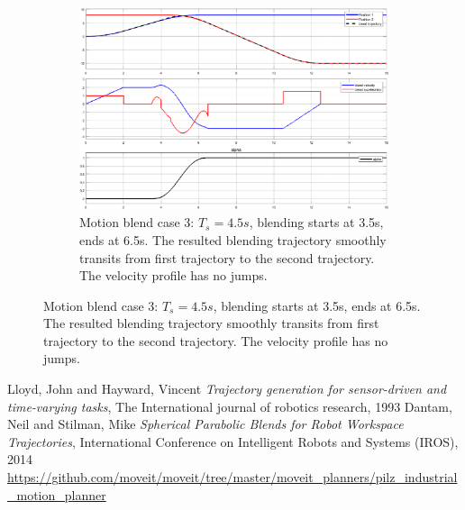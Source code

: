 \documentclass{article}
\begin{document}
\begin{figure}[ht]
	\begin{subfigure}[ht]{0.8\textwidth}%
		\centering
		\includegraphics[width=0.8\columnwidth]{figure/blend_case_3.eps}%
		\caption{Motion blend case 3: $T_s = 4.5s$, blending starts at 3.5s, ends at 6.5s. The resulted blending trajectory smoothly transits from first trajectory to the second trajectory. The velocity profile has no jumps.}%
		\label{blend_case_3}%
	\end{subfigure}

\end{figure}


\begin{thebibliography}{9}
Lloyd, John and Hayward, Vincent \textit{Trajectory generation for sensor-driven and time-varying tasks}, The International journal of robotics research, 1993
Dantam, Neil and Stilman, Mike \textit{Spherical Parabolic Blends for Robot Workspace Trajectories}, International Conference on Intelligent Robots and Systems (IROS), 2014
\url{https://github.com/moveit/moveit/tree/master/moveit_planners/pilz_industrial_motion_planner}
\end{thebibliography}
\end{document}
